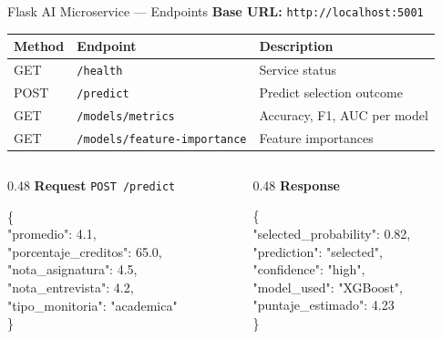 \documentclass[aspectratio=169,12pt]{beamer}
\begin{document}
\begin{frame}[fragile]{Flask AI Microservice — Endpoints}
  \textbf{Base URL:} \texttt{http://localhost:5001}
  \vspace{0.3cm}
  \begin{table}
    \footnotesize
    \begin{tabular}{lll}
      \toprule
      \textbf{Method} & \textbf{Endpoint} & \textbf{Description} \\
      \midrule
      GET  & \texttt{/health}                    & Service status \\
      POST & \texttt{/predict}                   & Predict selection outcome \\
      GET  & \texttt{/models/metrics}            & Accuracy, F1, AUC per model \\
      GET  & \texttt{/models/feature-importance} & Feature importances \\
      \bottomrule
    \end{tabular}
  \end{table}
  \vspace{0.3cm}
  \begin{columns}[T]
    \begin{column}{0.48\textwidth}
      \textbf{Request} \texttt{POST /predict}
      \begin{block}{}
        \tiny\ttfamily
        \{\\
        \quad"promedio": 4.1,\\
        \quad"porcentaje\_creditos": 65.0,\\
        \quad"nota\_asignatura": 4.5,\\
        \quad"nota\_entrevista": 4.2,\\
        \quad"tipo\_monitoria": "academica"\\
        \}
      \end{block}
    \end{column}
    \begin{column}{0.48\textwidth}
      \textbf{Response}
      \begin{block}{}
        \tiny\ttfamily
        \{\\
        \quad"selected\_probability": 0.82,\\
        \quad"prediction": "selected",\\
        \quad"confidence": "high",\\
        \quad"model\_used": "XGBoost",\\
        \quad"puntaje\_estimado": 4.23\\
        \}
      \end{block}
    \end{column}
  \end{columns}
\end{frame}
\end{document}

